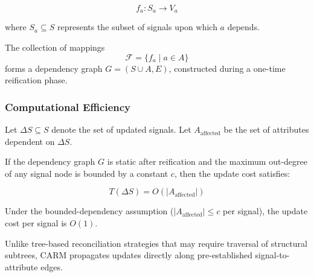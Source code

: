 \[
f_a : S_a \to V_a
\]

where $S_a \subseteq S$ represents the subset of signals upon which $a$ depends.

The collection of mappings
\[
\mathcal{F} = \{ f_a \mid a \in A \}
\]
forms a dependency graph $G = (S \cup A, E)$, 
constructed during a one-time reification phase.
\subsubsection{Computational Efficiency}

Let $\Delta S \subseteq S$ denote the set of updated signals.
Let $A_{\text{affected}}$ be the set of attributes dependent on $\Delta S$.

If the dependency graph $G$ is static after reification and 
the maximum out-degree of any signal node is bounded by a constant $c$,
then the update cost satisfies:

\[
T(\Delta S) = O(|A_{\text{affected}}|)
\]

Under the bounded-dependency assumption ($|A_{\text{affected}}| \le c$ per signal),
the update cost per signal is $O(1)$.

Unlike tree-based reconciliation strategies that may require traversal of
structural subtrees, CARM propagates updates directly along pre-established
signal-to-attribute edges.
